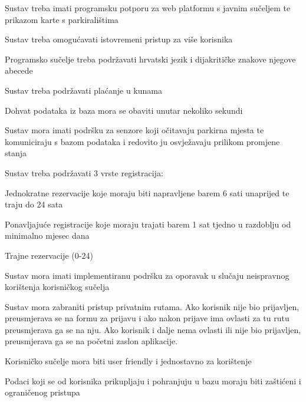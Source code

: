 \begin{packed_item}
	
	\item Sustav treba imati programsku potporu za web platformu s javnim sučeljem te prikazom karte s parkiralištima
	\item Sustav treba omogućavati istovremeni pristup za više korisnika 
	\item Programsko sučelje treba podržavati hrvatski jezik i dijakritičke znakove njegove abecede
	\item Sustav treba podržavati plaćanje u kunama
	\item Dohvat podataka iz baza mora se obaviti unutar nekoliko sekundi
	\item Sustav mora imati podršku za senzore koji očitavaju parkirna mjesta te komuniciraju s bazom podataka i redovito ju osvježavaju prilikom promjene stanja
    \item Sustav treba podržavati 3 vrste registracija:
        	\item[] \begin{packed_enum}
		
		\item Jednokratne rezervacije koje moraju biti napravljene barem 6 sati unaprijed te traju do 24 sata
		\item Ponavljajuće registracije koje moraju trajati barem 1 sat tjedno u razdoblju od minimalno mjesec dana
		\item Trajne rezervacije (0-24)
		
	\end{packed_enum}
    \item Sustav mora imati implementiranu podršku za oporavak u slučaju neispravnog korištenja korisničkog sučelja
    \item Sustav mora zabraniti pristup privatnim rutama. Ako korisnik nije bio prijavljen, preusmjerava se na formu za prijavu i ako nakon prijave ima ovlasti za tu rutu preusmjerava ga se na nju. Ako korisnik i dalje nema ovlasti ili nije bio prijavljen, preusmjerava ga se na početni zaslon aplikacije.
    \item Korisničko sučelje mora biti user friendly i jednostavno za korištenje
    \item Podaci koji se od korisnika prikupljaju i pohranjuju u bazu moraju biti zaštićeni i ograničenog pristupa
\end{packed_item}